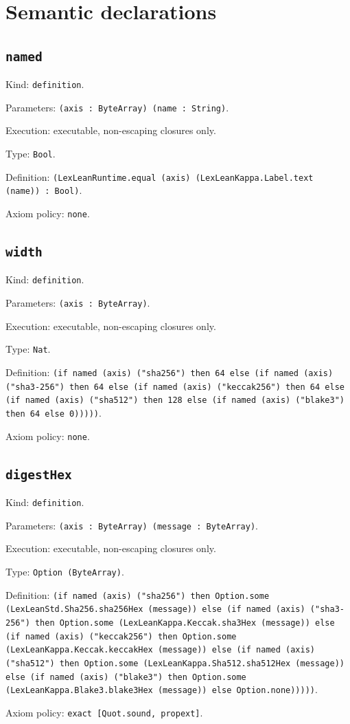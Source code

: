 \documentclass[11pt]{article}
\begin{document}
\section*{Semantic declarations}
\subsection*{\texttt{named}}
\noindent Kind: \texttt{definition}.\par
\noindent Parameters: \texttt{(axis : ByteArray) (name : String)}.\par
\noindent Execution: executable, non-escaping closures only.\par
\noindent Type: \texttt{Bool}.\par
\noindent Definition: \texttt{(LexLeanRuntime.equal (axis) (LexLeanKappa.Label.text (name)) : Bool)}.\par
\noindent Axiom policy: \texttt{none}.\par
\subsection*{\texttt{width}}
\noindent Kind: \texttt{definition}.\par
\noindent Parameters: \texttt{(axis : ByteArray)}.\par
\noindent Execution: executable, non-escaping closures only.\par
\noindent Type: \texttt{Nat}.\par
\noindent Definition: \texttt{(if named (axis) ("sha256") then 64 else (if named (axis) ("sha3-256") then 64 else (if named (axis) ("keccak256") then 64 else (if named (axis) ("sha512") then 128 else (if named (axis) ("blake3") then 64 else 0)))))}.\par
\noindent Axiom policy: \texttt{none}.\par
\subsection*{\texttt{digestHex}}
\noindent Kind: \texttt{definition}.\par
\noindent Parameters: \texttt{(axis : ByteArray) (message : ByteArray)}.\par
\noindent Execution: executable, non-escaping closures only.\par
\noindent Type: \texttt{Option (ByteArray)}.\par
\noindent Definition: \texttt{(if named (axis) ("sha256") then Option.some (LexLeanStd.Sha256.sha256Hex (message)) else (if named (axis) ("sha3-256") then Option.some (LexLeanKappa.Keccak.sha3Hex (message)) else (if named (axis) ("keccak256") then Option.some (LexLeanKappa.Keccak.keccakHex (message)) else (if named (axis) ("sha512") then Option.some (LexLeanKappa.Sha512.sha512Hex (message)) else (if named (axis) ("blake3") then Option.some (LexLeanKappa.Blake3.blake3Hex (message)) else Option.none)))))}.\par
\noindent Axiom policy: \texttt{exact [Quot.sound, propext]}.\par
\end{document}
